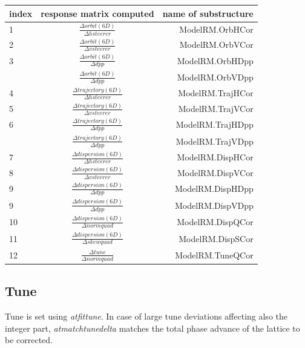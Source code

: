\begin{table}[hbp]
	\centering
		\begin{tabular}{l c r}
  index & response matrix computed & name of substructure \\
	\hline
	1  &   $\frac{\Delta  orbit (6D) }{ \Delta h steerer }$   &    ModelRM.OrbHCor \\
	\hline
  2  &    $\frac{\Delta  orbit (6D) }{ \Delta v steerer }$    &  ModelRM.OrbVCor \\
  \hline
  3  &    $\frac{\Delta  orbit (6D) }{ \Delta dpp       }$    &  ModelRM.OrbHDpp\\
     &    $\frac{\Delta  orbit (6D) }{ \Delta dpp       }$    &  ModelRM.OrbVDpp\\
  \hline
  4  &    $\frac{\Delta  trajectory (6D) }{ \Delta h steerer }$& ModelRM.TrajHCor\\
  \hline
  5  &    $\frac{\Delta  trajectory (6D) }{ \Delta v steerer }$& ModelRM.TrajVCor\\
  \hline
  6  &    $\frac{\Delta  trajectory (6D) }{ \Delta dpp       }$& ModelRM.TrajHDpp\\
     &    $\frac{\Delta  trajectory (6D) }{ \Delta dpp       }$& ModelRM.TrajVDpp\\
  \hline
  7  &    $\frac{\Delta  dispersion (6D) }{ \Delta h steerer }$& ModelRM.DispHCor\\
  \hline
  8  &    $\frac{\Delta  dispersion (6D) }{ \Delta v steerer }$& ModelRM.DispVCor\\
  \hline
  9  &    $\frac{\Delta  dispersion (6D) }{ \Delta dpp       }$& ModelRM.DispHDpp\\
  9  &    $\frac{\Delta  dispersion (6D) }{ \Delta dpp       }$& ModelRM.DispVDpp\\
 \hline
  10  &    $\frac{\Delta  dispersion (6D) }{ \Delta norm quad }$& ModelRM.DispQCor\\
 \hline
  11  &    $\frac{\Delta  dispersion (6D) }{ \Delta skew quad }$& ModelRM.DispSCor\\
 \hline
  12  &    $\frac{\Delta  tune            }{ \Delta norm quad }$& ModelRM.TuneQCor\\
	\hline
  	\end{tabular}
\end{table}


\clearpage
\subsection{Tune}
Tune is set using \emph{atfittune}. In case of large tune deviations affecting also the integer part, \emph{atmatchtunedelta} matches the total phase advance of the lattice to be corrected. 


